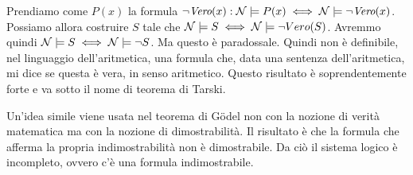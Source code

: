 Prendiamo come $P(x)$ la formula $\lnot \textit{Vero}(x): \mathcal{N} \models P(x) \iff \mathcal{N} \models
\lnot \textit{Vero}(x)$. Possiamo allora costruire $S$ tale che $\mathcal{N} \models S \iff \mathcal{N}
\models \lnot Vero (S)$. Avremmo quindi $\mathcal{N} \models S \iff \mathcal{N} \models \lnot S$. Ma questo è
paradossale.  Quindi non è definibile, nel linguaggio dell'aritmetica, una formula che, data una
sentenza dell'aritmetica, mi dice se questa è vera, in senso aritmetico. Questo risultato è
soprendentemente forte e va sotto il nome di teorema di Tarski.

Un'idea simile viene usata nel teorema di Gödel non con la nozione di verità matematica ma con la
nozione di dimostrabilità. Il risultato è che la formula che afferma la propria indimostrabilità
non è dimostrabile. Da ciò il sistema logico è incompleto, ovvero c'è una formula indimostrabile.
